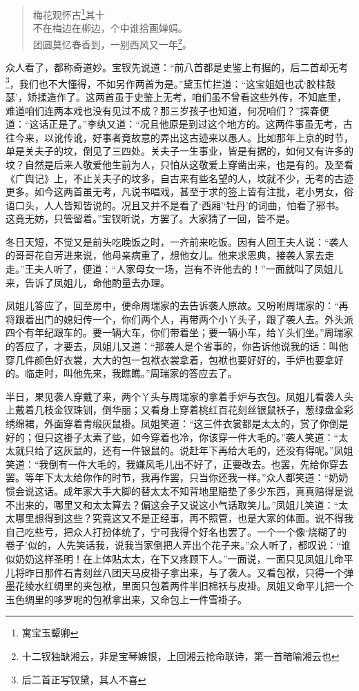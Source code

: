 \documentclass[12pt,oneside]{book}
\newenvironment{shici}{%
\begin{verse}%
\centering\large\hspace{12pt}}%
{\end{verse}}
\begin{document}
\begin{shici}
梅花观怀古\footnote{寓宝玉颦卿}其十\\
不在梅边在柳边，个中谁拾画婵娟。\\
团圆莫忆春香到，一别西风又一年\footnote{十二钗独缺湘云，非是宝琴嫉恨，上回湘云抢命联诗，第一首暗喻湘云也}。
\end{shici}


众人看了，都称奇道妙。宝钗先说道：“前八首都是史鉴上有据的，后二首却无考\footnote{后二首正写钗黛，其人不喜}，我们也不大懂得，不如另作两首为是。”黛玉忙拦道：“这宝姐姐也忒‘胶柱鼓瑟’，矫揉造作了。这两首虽于史鉴上无考，咱们虽不曾看这些外传，不知底里，难道咱们连两本戏也没有见过不成？那三岁孩子也知道，何况咱们？”探春便道：“这话正是了。”李纨又道：“况且他原是到过这个地方的。这两件事虽无考，古往今来，以讹传讹，好事者竟故意的弄出这古迹来以愚人。比如那年上京的时节，单是关夫子的坟，倒见了三四处。关夫子一生事业，皆是有据的，如何又有许多的坟？自然是后来人敬爱他生前为人，只怕从这敬爱上穿凿出来，也是有的。及至看《广舆记》上，不止关夫子的坟多，自古来有些名望的人，坟就不少，无考的古迹更多。如今这两首虽无考，凡说书唱戏，甚至于求的签上皆有注批，老小男女，俗语口头，人人皆知皆说的。况且又并不是看了‘西厢’‘牡丹’的词曲，怕看了邪书。这竟无妨，只管留着。”宝钗听说，方罢了。大家猜了一回，皆不是。

冬日天短，不觉又是前头吃晚饭之时，一齐前来吃饭。因有人回王夫人说：“袭人的哥哥花自芳进来说，他母亲病重了，想他女儿。他来求恩典，接袭人家去走走。”王夫人听了，便道：“人家母女一场，岂有不许他去的！”一面就叫了凤姐儿来，告诉了凤姐儿，命他酌量去办理。

凤姐儿答应了，回至房中，便命周瑞家的去告诉袭人原故。又吩咐周瑞家的：“再将跟着出门的媳妇传一个，你们两个人，再带两个小丫头子，跟了袭人去。外头派四个有年纪跟车的。要一辆大车，你们带着坐；要一辆小车，给丫头们坐。”周瑞家的答应了，才要去，凤姐儿又道：“那袭人是个省事的，你告诉他说我的话：叫他穿几件颜色好衣裳，大大的包一包袱衣裳拿着，包袱也要好好的，手炉也要拿好的。临走时，叫他先来，我瞧瞧。”周瑞家的答应去了。

半日，果见袭人穿戴了来，两个丫头与周瑞家的拿着手炉与衣包。凤姐儿看袭人头上戴着几枝金钗珠钏，倒华丽；又看身上穿着桃红百花刻丝银鼠袄子，葱绿盘金彩绣绵裙，外面穿着青缎灰鼠褂。凤姐笑道：“这三件衣裳都是太太的，赏了你倒是好的；但只这褂子太素了些，如今穿着也冷，你该穿一件大毛的。”袭人笑道：“太太就只给了这灰鼠的，还有一件银鼠的。说赶年下再给大毛的，还没有得呢。”凤姐笑道：“我倒有一件大毛的，我嫌风毛儿出不好了，正要改去。也罢，先给你穿去罢。等年下太太给你作的时节，我再作罢，只当你还我一样。”众人都笑道：“奶奶惯会说这话。成年家大手大脚的替太太不知背地里赔垫了多少东西，真真赔得是说不出来的，哪里又和太太算去？偏这会子又说这小气话取笑儿。”凤姐儿笑道：“太太哪里想得到这些？究竟这又不是正经事，再不照管，也是大家的体面。说不得我自己吃些亏，把众人打扮体统了，宁可我得个好名也罢了。一个一个像‘烧糊了的卷子’似的，人先笑话我，说我当家倒把人弄出个花子来。”众人听了，都叹说：“谁似奶奶这样圣明！在上体贴太太，在下又疼顾下人。”一面说，一面只见凤姐儿命平儿将昨日那件石青刻丝八团天马皮褂子拿出来，与了袭人。又看包袱，只得一个弹墨花绫水红绸里的夹包袱，里面只包着两件半旧棉袄与皮褂。凤姐又命平儿把一个玉色绸里的哆罗呢的包袱拿出来，又命包上一件雪褂子。
\end{document}
